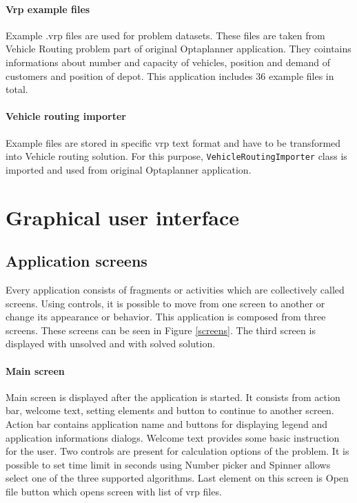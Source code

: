 \paragraph{Vrp example files}
Example .vrp files are used for problem datasets. These files are taken from Vehicle Routing problem part of original
Optaplanner application. They cointains informations about number and capacity of vehicles, position and demand of
customers and position of depot. This application includes 36 example files in total.

\paragraph{Vehicle routing importer}
Example files are stored in specific vrp text format and have to be transformed into Vehicle routing solution. For this
purpose, \texttt{VehicleRoutingImporter} class is imported and used from original Optaplanner application.

\section{Graphical user interface}\label{guiSection}

\subsection{Application screens}
Every application consists of fragments or activities which are collectively called screens. Using controls, it is
possible to move from one screen to another or change its appearance or behavior. This application is composed from
three screens. These screens can be seen in Figure \ref{screens}. The third screen is displayed with unsolved and with
solved solution.

\paragraph{Main screen}
Main screen is displayed after the application is started. It consists from action bar, welcome text, setting elements
and button to continue to another screen. Action bar contains application name and buttons for displaying legend and
application informations dialogs. Welcome text provides some basic instruction for the user. Two controls are present
for calculation options of the problem. It is possible to set time limit in seconds using Number picker and Spinner
allows select one of the three supported algorithms. Last element on this screen is Open file button which opens screen
with list of vrp files.


